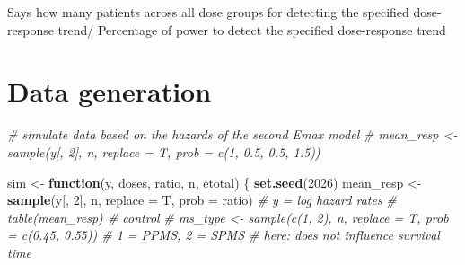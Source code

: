 \documentclass[
]{article}
\newenvironment{Shaded}{\begin{snugshade}}{\end{snugshade}}
\newcommand{\AttributeTok}[1]{\textcolor[rgb]{0.13,0.29,0.53}{#1}}
\newcommand{\CommentTok}[1]{\textcolor[rgb]{0.56,0.35,0.01}{\textit{#1}}}
\newcommand{\ControlFlowTok}[1]{\textcolor[rgb]{0.13,0.29,0.53}{\textbf{#1}}}
\newcommand{\DecValTok}[1]{\textcolor[rgb]{0.00,0.00,0.81}{#1}}
\newcommand{\FunctionTok}[1]{\textcolor[rgb]{0.13,0.29,0.53}{\textbf{#1}}}
\newcommand{\NormalTok}[1]{#1}
\newcommand{\OtherTok}[1]{\textcolor[rgb]{0.56,0.35,0.01}{#1}}
\begin{document}
Says how many patients across all dose groups for detecting the
specified dose-response trend/ Percentage of power to detect the
specified dose-response trend

\hypertarget{data-generation}{%
\section{Data generation}\label{data-generation}}

\begin{Shaded}
\begin{Highlighting}[]
\CommentTok{\# simulate data based on the hazards of the second Emax model}
\CommentTok{\# mean\_resp \textless{}{-} sample(y[, 2], n, replace = T, prob = c(1, 0.5, 0.5, 1.5))}

\NormalTok{sim }\OtherTok{\textless{}{-}} \ControlFlowTok{function}\NormalTok{(y, doses, ratio, n, etotal) \{}
  \FunctionTok{set.seed}\NormalTok{(}\DecValTok{2026}\NormalTok{)}
\NormalTok{  mean\_resp }\OtherTok{\textless{}{-}}
    \FunctionTok{sample}\NormalTok{(y[, }\DecValTok{2}\NormalTok{], n, }\AttributeTok{replace =}\NormalTok{ T, }\AttributeTok{prob =}\NormalTok{ ratio) }\CommentTok{\# y = log hazard rates}
  \CommentTok{\# table(mean\_resp) \# control}
  \CommentTok{\# ms\_type \textless{}{-} sample(c(1, 2), n, replace = T, prob = c(0.45, 0.55)) \# 1 = PPMS, 2 = SPMS \# here: does not influence survival time}
  

\end{Highlighting}
\end{Shaded}
\end{document}
